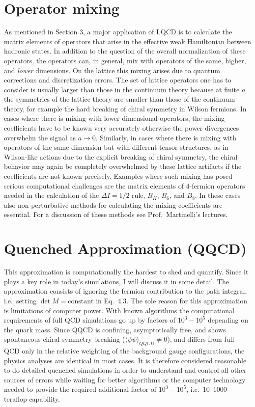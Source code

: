 \section{Operator mixing}

As mentioned in Section 3, a major application of LQCD is to calculate the matrix elements of operators that arise in the effective weak Hamiltonian between hadronic states. In addition to the question of the overall normalization of these operators, the operators can, in general, mix with operators of the same, higher, and \textit{lower} dimensions. On the lattice this mixing arises due to quantum corrections and discretization errors. The set of lattice operators one has to consider is usually larger than those in the continuum theory because at finite $a$ the symmetries of the lattice theory are smaller than those of the continuum theory, for example the hard breaking of chiral symmetry in Wilson fermions. In cases where there is mixing with lower dimensional operators, the mixing coefficients have to be known very accurately otherwise the power divergences overwhelm the signal as $a \to 0$. Similarly, in cases where there is mixing with operators of the same dimension but with different tensor structures, as in Wilson-like actions due to the explicit breaking of chiral symmetry, the chiral behavior may again be completely overwhelmed by these lattice artifacts if the coefficients are not known precisely. Examples where such mixing has posed serious computational challenges are the matrix elements of 4-fermion operators needed in the calculation of the $\Delta I = 1/2$ rule, $B_K$, $B_6$, and $B_8$. In these cases also non-perturbative methods for calculating the mixing coefficients are essential. For a discussion of these methods see Prof.~Martinelli's lectures.

\section{Quenched Approximation (QQCD)}

This approximation is computationally the hardest to shed and quantify. Since it plays a key role in today's simulations, I will discuss it in some detail. The approximation consists of ignoring the fermion contribution to the path integral, i.e.~setting $\det M = \mathrm{constant}$ in Eq.~4.3. The sole reason for this approximation is limitations of computer power. With known algorithms the computational requirements of full QCD simulations go up by factors of $10^3 - 10^5$ depending on the quark mass. Since QQCD is confining, asymptotically free, and shows spontaneous chiral symmetry breaking ($\langle \bar{\psi}\psi\rangle_{QQCD} \neq 0$), and differs from full QCD only in the relative weighting of the background gauge configurations, the physics analyses are identical in most cases. It is therefore considered reasonable to do detailed quenched simulations in order to understand and control all other sources of errors while waiting for better algorithms or the computer technology needed to provide the required additional factor of $10^3 - 10^5$, i.e.~10--1000 teraflop capability.

